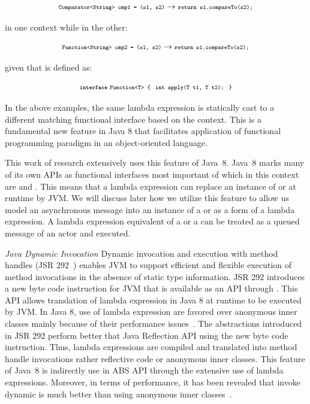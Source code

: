 $$
{\scriptsize\texttt{Comparator<String> cmp1 = (s1, s2)}} \to {\scriptsize\texttt{return s1.compareTo(s2);}}
$$

in one context while in the other:

$$
{\scriptsize\texttt{Function<String> cmp2 = (s1, s2)}} \to {\scriptsize\texttt{return s1.compareTo(s2);}}
$$

given that  is defined as:

$$
\textbf{\scriptsize\texttt{interface}} \; {\scriptsize\texttt{Function<T> \{\;
  int apply(T t1, T t2); \;\}}}
$$

In the above examples, the same lambda expression is statically cast to a different matching functional interface based on the context.
This is a fundamental new feature in Java 8 that facilitates application of functional programming paradigm in an object-oriented language.

This work of research extensively uses this feature of Java~8.
Java~8 marks many of its own APIs as functional interfaces most important of which in this context are  and .
This means that a lambda expression can replace an instance of  or  at runtime by JVM.
We will discuss later how we utilize this feature to allow us model an asynchronous message into an instance of a  or  as a form of a lambda expression.
A lambda expression equivalent of a  or a  can be treated as a queued message of an actor and executed.

\textsl{Java Dynamic Invocation}
Dynamic invocation and execution with method handles (JSR 292~\cite{jsr292:invokedyn}) enables JVM to support efficient and flexible execution of method invocations in the absence of static type information. 
JSR 292 introduces a new byte code instruction  for JVM that is available as an API through .
This API allows translation of lambda expression in Java 8 at runtime to be executed by JVM.
In Java 8, use of lambda expression are favored over anonymous inner classes mainly because of their performance issues~\cite{lambda:perf}.
The abstractions introduced in JSR 292 perform better that Java Reflection API using the new byte code instruction. 
Thus, lambda expressions are compiled and translated into method handle invocations rather reflective code or anonymous inner classes.
This feature of Java~8 is indirectly use in ABS API through the extensive use of lambda expressions.
Moreover, in terms of performance, it has been revealed that invoke dynamic is much better than using anonymous inner classes~\cite{lambda:perf}.

